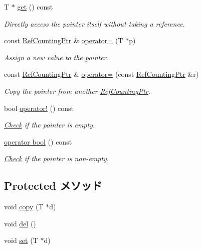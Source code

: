 \begin{DoxyCompactItemize}
T $\ast$ \hyperlink{classRefCountingPtr_a07f851191ad3a7c5c1598ef14f710f96}{get} () const 
\begin{DoxyCompactList}\small\item\em Directly access the pointer itself without taking a reference. \item\end{DoxyCompactList}\item 
const \hyperlink{classRefCountingPtr}{RefCountingPtr} \& \hyperlink{classRefCountingPtr_abe913c8dc8f8a418383762d6688f08e4}{operator=} (T $\ast$p)
\begin{DoxyCompactList}\small\item\em Assign a new value to the pointer. \item\end{DoxyCompactList}\item 
const \hyperlink{classRefCountingPtr}{RefCountingPtr} \& \hyperlink{classRefCountingPtr_a5227acb51502321f8d32744c73b9f6e3}{operator=} (const \hyperlink{classRefCountingPtr}{RefCountingPtr} \&r)
\begin{DoxyCompactList}\small\item\em Copy the pointer from another \hyperlink{classRefCountingPtr}{RefCountingPtr}. \item\end{DoxyCompactList}\item 
bool \hyperlink{classRefCountingPtr_ac8b1d32dbd52d431450c70b151cfa205}{operator!} () const 
\begin{DoxyCompactList}\small\item\em \hyperlink{classCheck}{Check} if the pointer is empty. \item\end{DoxyCompactList}\item 
\hyperlink{classRefCountingPtr_aa385aa18f5e42db5a415c25a90f4193d}{operator bool} () const 
\begin{DoxyCompactList}\small\item\em \hyperlink{classCheck}{Check} if the pointer is non-\/empty. \item\end{DoxyCompactList}\end{DoxyCompactItemize}
\subsection*{Protected メソッド}
\begin{DoxyCompactItemize}
\item 
void \hyperlink{classRefCountingPtr_a890d36110dbb21266898207adfb2a7d5}{copy} (T $\ast$d)
\item 
void \hyperlink{classRefCountingPtr_a13120ea5788aaacf44a89b193a0cceef}{del} ()
\item 
void \hyperlink{classRefCountingPtr_a4bc01a1a918510bef2013a1f089f19fd}{set} (T $\ast$d)
\end{DoxyCompactItemize}
